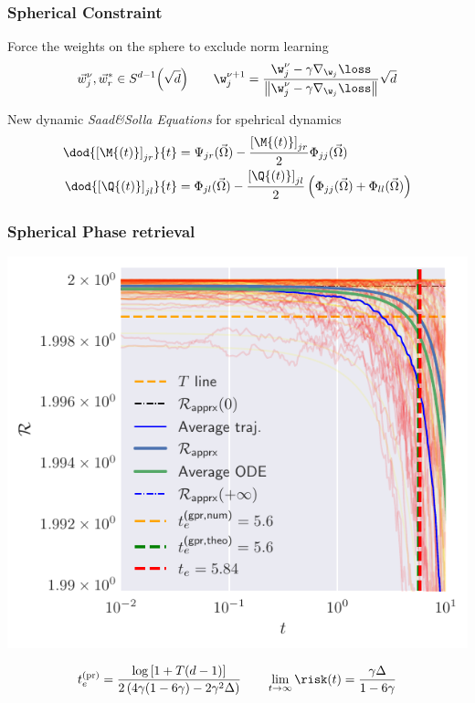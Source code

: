 \documentclass{beamer}
\begin{document}
\begin{frame}
  \frametitle{Spherical Constraint}
  Force the weights on the sphere to exclude norm learning
  \[
    \vec{w}^\nu_j, \vec{w}^*_r \in S^{d-1}{\left(\sqrt{d}\right)}\qquad
    \w^{\nu+1}_j =\frac{\w^{\nu}_j - \gamma \nabla_{\w_j}{\loss}}{\left\|\w^{\nu}_j - \gamma \nabla_{\w_j}{\loss}\right\|}\sqrt{d}
  \]
  \pause
  \vfill

  \begin{exampleblock}{New dynamic}
    \emph{Saad\&Solla Equations} for spehrical dynamics
    \[\begin{split}
      \dod{\left[\M{\left(t\right)}\right]_{jr}}{t} &= \Psi_{jr}{(\vec{\Omega})} - \frac{\left[\M{\left(t\right)}\right]_{jr}}{2}\Phi_{jj}{(\vec{\Omega})} \\
      \dod{\left[\Q{\left(t\right)}\right]_{jl}}{t} &= \Phi_{jl}{(\vec{\Omega})} - \frac{\left[\Q{\left(t\right)}\right]_{jl}}{2}\left(\Phi_{jj}{(\vec{\Omega})}+\Phi_{ll}{(\vec{\Omega})}\right)
    \end{split}\]
  \end{exampleblock}
\end{frame}

\begin{frame}
  \frametitle{Spherical Phase retrieval}
  \vspace{-10pt}
  \begin{center}
    \includegraphics[width=.74\textwidth]{figures/spherical/spr-example-d10000-zoom.pdf}
  \end{center}
    \vspace{-8pt}
    \[
      t^\text{(pr)}_e = \frac{\log\left[1+T(d-1)\right]}{2\left(4\gamma(1-6\gamma)-2\gamma^2\Delta\right)}
      \qquad
      \lim_{t\to\infty}\risk(t) = \frac{\gamma\Delta}{1-6\gamma}
    \]
\end{frame}
\end{document}
